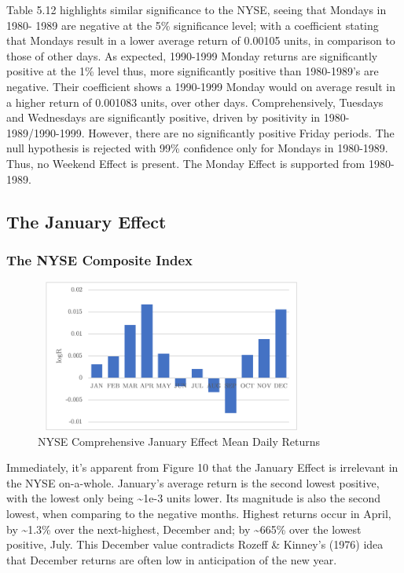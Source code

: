 \documentclass[11pt, english]{article}
\begin{document}
	Table 5.12 highlights similar significance to the NYSE, seeing that Mondays in 1980- 1989 are negative at the 5\% significance level; with a coefficient stating that Mondays result in a lower average return of 0.00105 units, in comparison to those of other days. As expected, 1990-1999 Monday returns are significantly positive at the 1\% level thus, more significantly positive than 1980-1989’s are negative. Their coefficient shows a 1990-1999 Monday would on average result in a higher return of 0.001083 units, over other days. Comprehensively, Tuesdays and Wednesdays are significantly positive, driven by positivity in 1980-1989/1990-1999. However, there are no significantly positive Friday periods. The null hypothesis is rejected with 99\% confidence only for Mondays in 1980-1989. Thus, no Weekend Effect is present. The Monday Effect is supported from 1980-1989.

	\newpage

	\subsection{The January Effect}

		\subsubsection{The NYSE Composite Index}

	\begin{figure}[H]
        \begin{center}
                \includegraphics[width=9cm,height=5cm]{NYSE-JE1.png} 
                \caption{NYSE Comprehensive January Effect Mean Daily Returns}
        \end{center}
        \end{figure}

	Immediately, it’s apparent from Figure 10 that the January Effect is irrelevant in the NYSE on-a-whole. January’s average return is the second lowest positive, with the lowest only being \~{}1e-3 units lower. Its magnitude is also the second lowest, when comparing to the negative months. Highest returns occur in April, by \~{}1.3\% over the next-highest, December and; by \~{}665\% over the lowest positive, July. This December value contradicts Rozeff \& Kinney’s (1976) idea that December returns are often low in anticipation of the new year.
\end{document}
